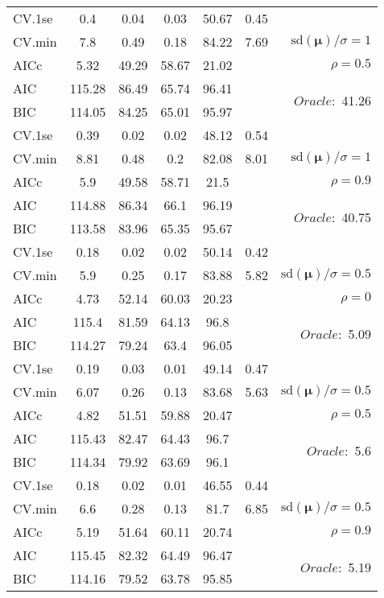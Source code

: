 \begin{table}
\begin{center}
\begin{tabular}{l*{5}{c}|r}
 \hline 
CV.1se & 0.4 & 0.04 & 0.03 & 50.67 & 0.45 & \\
CV.min & 7.8 & 0.49 & 0.18 & 84.22 & 7.69 &  $\mathrm{sd}(\mathbf{\mu})/\sigma=1$ \\
AICc & 5.32 & 49.29 & 58.67 & 21.02 & & $\rho=0.5$ \\
AIC & 115.28 & 86.49 & 65.74 & 96.41 & &  \multirow{2}{*}{$Oracle: $ 41.26} \\
BIC & 114.05 & 84.25 & 65.01 & 95.97 & &  \\
 \hline 
CV.1se & 0.39 & 0.02 & 0.02 & 48.12 & 0.54 & \\
CV.min & 8.81 & 0.48 & 0.2 & 82.08 & 8.01 &  $\mathrm{sd}(\mathbf{\mu})/\sigma=1$ \\
AICc & 5.9 & 49.58 & 58.71 & 21.5 & & $\rho=0.9$ \\
AIC & 114.88 & 86.34 & 66.1 & 96.19 & &  \multirow{2}{*}{$Oracle: $ 40.75} \\
BIC & 113.58 & 83.96 & 65.35 & 95.67 & &  \\
 \hline 
CV.1se & 0.18 & 0.02 & 0.02 & 50.14 & 0.42 & \\
CV.min & 5.9 & 0.25 & 0.17 & 83.88 & 5.82 &  $\mathrm{sd}(\mathbf{\mu})/\sigma=0.5$ \\
AICc & 4.73 & 52.14 & 60.03 & 20.23 & & $\rho=0$ \\
AIC & 115.4 & 81.59 & 64.13 & 96.8 & &  \multirow{2}{*}{$Oracle: $ 5.09} \\
BIC & 114.27 & 79.24 & 63.4 & 96.05 & &  \\
 \hline 
CV.1se & 0.19 & 0.03 & 0.01 & 49.14 & 0.47 & \\
CV.min & 6.07 & 0.26 & 0.13 & 83.68 & 5.63 &  $\mathrm{sd}(\mathbf{\mu})/\sigma=0.5$ \\
AICc & 4.82 & 51.51 & 59.88 & 20.47 & & $\rho=0.5$ \\
AIC & 115.43 & 82.47 & 64.43 & 96.7 & &  \multirow{2}{*}{$Oracle: $ 5.6} \\
BIC & 114.34 & 79.92 & 63.69 & 96.1 & &  \\
 \hline 
CV.1se & 0.18 & 0.02 & 0.01 & 46.55 & 0.44 & \\
CV.min & 6.6 & 0.28 & 0.13 & 81.7 & 6.85 &  $\mathrm{sd}(\mathbf{\mu})/\sigma=0.5$ \\
AICc & 5.19 & 51.64 & 60.11 & 20.74 & & $\rho=0.9$ \\
AIC & 115.45 & 82.32 & 64.49 & 96.47 & &  \multirow{2}{*}{$Oracle: $ 5.19} \\
BIC & 114.16 & 79.52 & 63.78 & 95.85 & &  \\
 \hline 
\end{tabular}
\end{center}
\vspace{-1cm}
\end{table}





